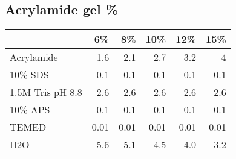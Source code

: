 \documentclass[a4paper,12pt]{article}
\begin{document}
	\subsection{Acrylamide gel \%}
	\begin{tabular}{l r r r r r}
	{\bf   } & {\bf 6\%} & {\bf 8\%} & {\bf 10\%} & {\bf 12\%} & {\bf 15\%}\\
			\hline
	Acrylamide	&	1.6	& 2.1 & 2.7 & 3.2 &	4 \\
	10\% SDS		 & 0.1	 & 0.1 & 	0.1 & 	0.1	 & 0.1\\
	1.5M Tris pH 8.8  & 2.6	 & 2.6	 & 2.6	 & 2.6	& 2.6\\
	10\% APS		 & 0.1	 & 0.1	 & 0.1	 & 0.1	 & 0.1\\
	TEMED		 & 0.01 & 0.01 & 0.01	 & 0.01	 & 0.01\\
	H2O		 & 5.6	 & 5.1	 & 4.5	 & 4.0	 & 3.2\\
		\hline
	
	\end{tabular}
\end{document}
